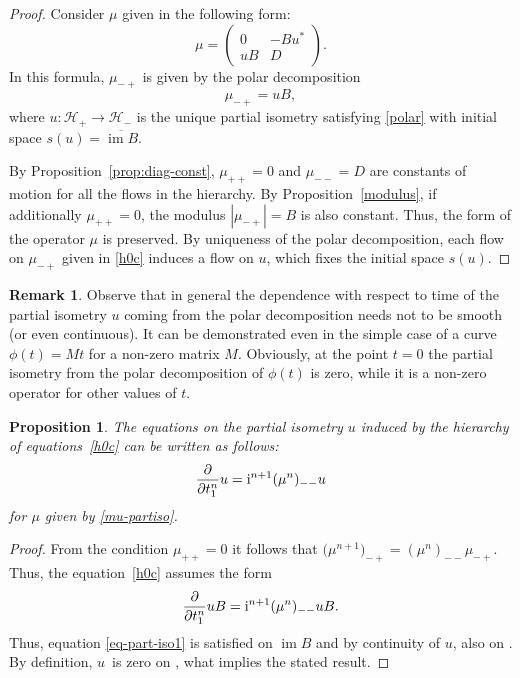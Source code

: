 \documentclass[10pt,a4paper]{amsart}
\newtheorem{prop}[thm]{Proposition}
\theoremstyle{definition}
\newtheorem{rem}[thm]{Remark}
\numberwithin{equation}{section}
\renewcommand{\H}{\mathcal{H}}
\DeclareMathOperator{\im}{im}
\newcommand{\abs}[1]{\left\vert#1\right\vert}
\renewcommand{\to}{\rightarrow}
\newcommand{\be}{\begin{equation}}
\newcommand{\ee}{\end{equation}}
\begin{document}
\begin{proof}

Consider $\mu$ given in the following form:
\be\label{mu-partiso}
\mu = \left(
\begin{matrix}
 0 & -Bu^*\\
 uB & D
\end{matrix}
\right).\ee
In this formula, $\mu_{-+}$ is given by the polar decomposition
\be\label{polar} \mu_{-+} = u B,\ee
where $u\colon\H_+\to\H_-$ is the unique partial isometry satisfying \eqref{polar} with initial space $s(u)=\overline{\im B}$.

By Proposition~\ref{prop:diag-const}, $\mu_{++}=0$ and $\mu_{--}=D$ are constants of motion for all the flows in the hierarchy. By Proposition~\ref{modulus}, if additionally $\mu_{++} = 0$, the modulus $\abs{\mu_{-+}} = B$ is also constant. Thus, the form of the operator $\mu$ is preserved. By uniqueness of the polar decomposition, each flow on $\mu_{-+}$ given in \eqref{h0c} induces a flow on $u$, which fixes the initial space $s(u)$.
\end{proof}

\begin{rem}
Observe that in general the dependence with respect to time of the partial isometry $u$ coming from the polar decomposition needs not to be smooth (or even continuous). It can be demonstrated even in the simple case of a curve $\phi(t)=M t$ for a non-zero matrix $M$. Obviously, at the point $t=0$ the partial isometry from the polar decomposition of $\phi(t)$ is zero, while it is a non-zero operator for other values of $t$.
\end{rem}

\begin{prop}\label{prop-part-iso1}
The equations on the partial isometry $u$ induced by the hierarchy of equations~\eqref{h0c} can be written as follows:
\be \label{eq-part-iso1}\frac\partial{\partial t^n_1} u = {\rm i}^{n+1} (\mu^{n})_{--} u\ee
for $\mu$ given by \eqref{mu-partiso}.
\end{prop}

\begin{proof}
From the condition $\mu_{++} = 0$ it follows that $\bigl(\mu^{n+1}\bigr)_{-+} = (\mu^n)_{--}\mu_{-+}$. Thus, the equation~\eqref{h0c} assumes the form
\[
\frac\partial{\partial t^n_1} uB = {\rm i}^{n+1} (\mu^{n})_{--} uB.
\]
Thus, equation \eqref{eq-part-iso1} is satisfied on $\im B$ and by continuity of $u$, also on \smash{$\overline{\im B}$}. By definition, $u$~is zero on \smash{$\overline{\im B}^\perp$}, what implies the stated result.
\end{proof}
\end{document}
